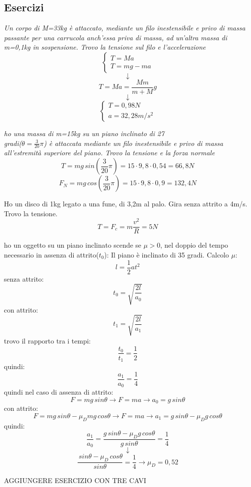 \documentclass[a4paper,12pt, oneside]{book}
\begin{document}
\subsection{Esercizi}
\begin{esercizio}
\textit{Un corpo di M=33kg è attaccato, mediante un filo inestensibile e privo di massa passante per una carrucola anch'essa priva di massa, ad un'altra massa di m=0,1kg in sospensione. Trovo la tensione sul filo e l'accelerazione}
$$\begin{cases}
T=Ma\\
T=mg-ma
\end{cases}$$
$$\downarrow$$
$$T=Ma=\frac{Mm}{m+M}g$$
$$\downarrow$$
$$\begin{cases}
T=0,98N\\
a=32,28m/s^2
\end{cases}$$
\end{esercizio}
\begin{esercizio}
\textit{ho una massa di m=15kg su un piano inclinato di 27\\ gradi($\theta=\frac{3}{20}\pi$) è attaccata mediante un filo inestensibile e privo di massa all'estremità superiore del piano. Trovo la tensione e la forza normale}
$$T=mg\,sin\left(\frac{3}{20}\pi\right)=15\cdot 9,8\cdot 0,54=66,8N$$
$$F_N=mg\,cos\left(\frac{3}{20}\pi\right)=15\cdot 9,8 \cdot 0,9=132,4N$$
\end{esercizio}
\begin{esercizio}
Ho un disco di 1kg legato a una fune, di 3,2m al palo. Gira senza attrito a 4m/s. Trovo la tensione.\\
$$T=F_c=m\frac{v^2}{R}=5N$$
\end{esercizio}
\begin{esercizio}
ho un oggetto su un piano inclinato scende se $\mu>0$, nel doppio del tempo necessario in assenza di attrito($t_0$): Il piano è inclinato di 35 gradi. Calcolo $\mu$:\\
$$l=\frac{1}{2}at^2$$
senza attrito:
$$t_0=\sqrt{\frac{2l}{a_0}}$$
con attrito:
$$t_1=\sqrt{\frac{2l}{a_1}}$$
trovo il rapporto tra i tempi:
$$\frac{t_0}{t_1}=\frac{1}{2}$$
quindi:
$$\frac{a_1}{a_0}=\frac{1}{4}$$
quindi nel caso di assenza di attrito:
$$F=mg\,sin\theta\to F=ma \to a_0= g\,sin\theta$$
con attrito:
$$F=mg\,sin\theta -\mu_D mg\,cos\theta\to F=ma\to a_1=g\,sin\theta -\mu_D g\, cos\theta$$
quindi:
$$\frac{a_1}{a_0}=\frac{g\,sin\theta -\mu_D g\, cos\theta}{g\,sin\theta}=\frac{1}{4}$$
$$\downarrow$$
$$\frac{\,sin\theta -\mu_D \, cos\theta}{sin\theta}=\frac{1}{4}\to \mu_D=0,52$$
\end{esercizio}
\begin{esercizio}
AGGIUNGERE ESERCIZIO CON TRE CAVI
\end{esercizio}
\begin{esercizio}

\end{esercizio}
\newpage
\end{document}
